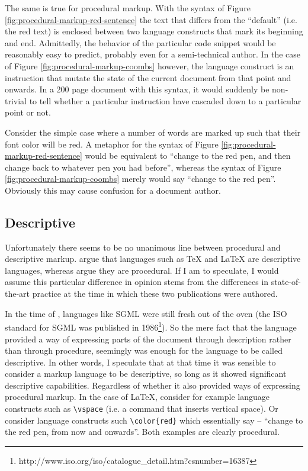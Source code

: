 \documentclass{scrreprt}
\begin{document}
The same is true for procedural markup. With the syntax of Figure \ref{fig:procedural-markup-red-sentence} the text that differs from the ``default'' (i.e. the red text) is enclosed between two language constructs that mark its beginning and end. Admittedly, the behavior of the particular code snippet would be reasonably easy to predict, probably even for a semi-technical author. In the case of Figure \ref{fig:procedural-markup-coombs} however, the language construct is an instruction that mutate the state of the current document from that point and onwards. In a 200 page document with this syntax, it would suddenly be non-trivial to tell whether a particular instruction have cascaded down to a particular point or not.

Consider the simple case where a number of words are marked up such that their font color will be red. A metaphor for the syntax of Figure \ref{fig:procedural-markup-red-sentence} would be equivalent to ``change to the red pen, and then change back to whatever pen you had before'', whereas the syntax of Figure \ref{fig:procedural-markup-coombs} merely would say ``change to the red pen''. Obviously this may cause confusion for a document author.




\subsection{Descriptive}
Unfortunately there seems to be no unanimous line between procedural and descriptive markup. \citet{coombs} argue that languages such as \TeX{} and \LaTeX{} are descriptive languages, whereas \citet{bray} argue they are procedural. If I am to speculate, I would assume this particular difference in opinion stems from the differences in state-of-the-art practice at the time in which these two publications were authored.


In the time of \citet{coombs}, languages like SGML were still fresh out of the oven (the ISO standard for SGML was published in 1986\footnote{http://www.iso.org/iso/catalogue\_detail.htm?csnumber=16387}). So the mere fact that the language provided a way of expressing parts of the document through description rather than through procedure, seemingly was enough for the language to be called descriptive. In other words, I speculate that at that time it was sensible to consider a markup language to be descriptive, so long as it showed significant descriptive capabilities. Regardless of whether it also provided ways of expressing procedural markup. In the case of \LaTeX{}, consider for example language constructs such as \texttt{\textbackslash vspace} (i.e. a command that inserts vertical space). Or consider language constructs such \texttt{\textbackslash color\{red\}} which essentially say -- ``change to the red pen, from now and onwards''. Both examples are clearly procedural.
\end{document}
